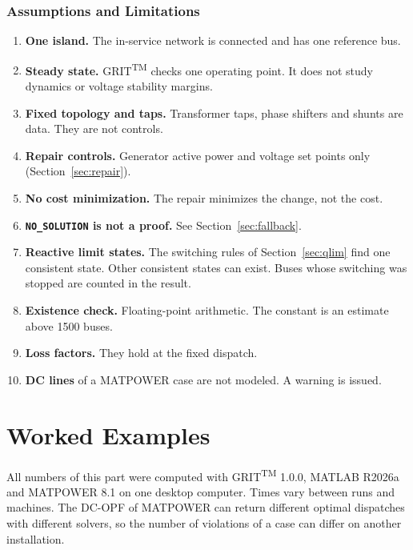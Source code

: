 \documentclass[a4paper,11pt]{article}
\newcommand{\TM}{\textsuperscript{TM}}
\newcommand{\GRIT}{GRIT\TM}
\begin{document}
\section{Assumptions and Limitations}\label{sec:limitations}

\begin{enumerate}[nosep]
  \item \textbf{One island.} The in-service network is connected and has one reference bus.
  \item \textbf{Steady state.} \GRIT{} checks one operating point. It does not study dynamics or voltage stability margins.
  \item \textbf{Fixed topology and taps.} Transformer taps, phase shifters and shunts are data. They are not controls.
  \item \textbf{Repair controls.} Generator active power and voltage set points only (Section~\ref{sec:repair}).
  \item \textbf{No cost minimization.} The repair minimizes the change, not the cost.
  \item \textbf{\texttt{NO\_SOLUTION} is not a proof.} See Section~\ref{sec:fallback}.
  \item \textbf{Reactive limit states.} The switching rules of Section~\ref{sec:qlim} find one consistent state. Other consistent states can exist. Buses whose switching was stopped are counted in the result.
  \item \textbf{Existence check.} Floating-point arithmetic. The constant is an estimate above 1500 buses.
  \item \textbf{Loss factors.} They hold at the fixed dispatch.
  \item \textbf{DC lines} of a MATPOWER case are not modeled. A warning is issued.
\end{enumerate}

\part{Worked Examples}\label{part:examples}

\clearpage
All numbers of this part were computed with \GRIT{} 1.0.0, MATLAB R2026a and MATPOWER 8.1 on one desktop computer. Times vary between runs and machines. The DC-OPF of MATPOWER can return different optimal dispatches with different solvers, so the number of violations of a case can differ on another installation.
\end{document}
